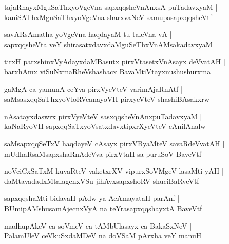 \documentclass[twoside,12pt,openright]{book}
\newcounter{shloka}[chapter]
\begin{document}
\begin{shloka}
tajaRnayxMguSaThxyoVgeVna sapxqqsheVnAnxsA puTadavxyaM |\\
kaniSAThxMguSaThxyoVgeVna sharxvaNeV samupasapxqqsheVtf 
\end{shloka}

\begin{shloka}
savARsAmatha yoVgeVna haqdayaM tu taleVna vA |\\
sapxqqsheVta veY shirasatxdavxdaMguSeThxVnAMsakadavxyaM 
\end{shloka}

\begin{shloka}
tirxH parxshinxVyAdayxdaMBasutx pirxVtasetxVnAsayx deVvatAH |\\
barxhAmx viSuNxmaRheVshashacx BavaMtiVtayxnushushurxma 
\end{shloka}

\begin{shloka}
gaMgA ca yamunA ceYva pirxVyeVteV varimAjaRnAtf |\\
saMsasxqqSaThxyoVloRVcanayoVH pirxyeVteV shashiBAsakxrw
\end{shloka}

\begin{shloka}
nAsatayxdaswrx pirxVyeVteV sasxqqsheVnAnxpuTadavxyaM |\\
kaNaRyoVH sapxqqSaTxyoVsatxdavxtipxrXyeVteV cAnilAnalw 
\end{shloka}

\begin{shloka}
saMsapxqqSeTxV haqdayeV cAsayx pirxVByaMteV savaRdeVvatAH |\\
mUdhaRsaMsapxshaRnAdeVva pirxVtaH sa puruSoV BaveVtf 
\end{shloka}

\begin{shloka}
noVciCxSaTxM kuvaRteV vaketxrXV vipurxSoVMgeV lasaMti yAH |\\
daMtavadadxMtalagenxVSu jihAvxsapxshoRV shuciBaRveVtf
\end{shloka}

\begin{shloka}
sapxqqshaMti bidavaH pAdw ya AcAmayataH parAnf |\\
BUmipAMshusamAjecnxVyA na teYrasapxqqshayxtA BaveVtf 
\end{shloka}

\begin{shloka}
madhupAkeV ca soVmeV ca tAMbUlasayx ca BakaSxNeV |\\
PalamUleV ceVkuSxdaMDeV na doVSaM pArxha veY manuH 
\end{shloka}
\end{document}
